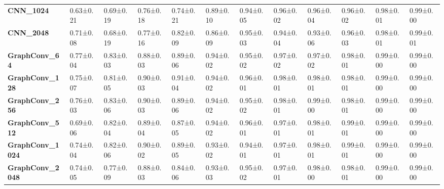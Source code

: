 \begin{tabular}{llllllllllll}
\textbf{CNN\_1024      } &   0.63±0.21 &  0.69±0.19 &  0.76±0.18 &  0.74±0.21 &  0.89±0.10 &  0.94±0.05 &  0.96±0.02 &  0.96±0.04 &  0.96±0.02 &   0.98±0.01 &   0.99±0.00 \\
\textbf{CNN\_2048      } &   0.71±0.08 &  0.68±0.19 &  0.77±0.16 &  0.82±0.09 &  0.86±0.09 &  0.95±0.03 &  0.94±0.04 &  0.93±0.06 &  0.96±0.03 &   0.98±0.01 &   0.99±0.01 \\
\textbf{GraphConv\_64  } &   0.77±0.04 &  0.83±0.03 &  0.88±0.03 &  0.89±0.06 &  0.94±0.02 &  0.95±0.02 &  0.97±0.02 &  0.97±0.02 &  0.98±0.01 &   0.99±0.00 &   0.99±0.00 \\
\textbf{GraphConv\_128 } &   0.75±0.07 &  0.81±0.05 &  0.90±0.03 &  0.91±0.04 &  0.94±0.02 &  0.96±0.01 &  0.98±0.01 &  0.98±0.01 &  0.98±0.01 &   0.99±0.00 &   0.99±0.00 \\
\textbf{GraphConv\_256 } &   0.76±0.03 &  0.83±0.06 &  0.90±0.03 &  0.89±0.06 &  0.94±0.02 &  0.95±0.02 &  0.98±0.01 &  0.99±0.00 &  0.98±0.01 &   0.99±0.00 &   0.99±0.00 \\
\textbf{GraphConv\_512 } &   0.69±0.06 &  0.82±0.04 &  0.89±0.04 &  0.87±0.05 &  0.94±0.02 &  0.96±0.01 &  0.97±0.01 &  0.98±0.01 &  0.99±0.01 &   0.99±0.00 &   0.99±0.00 \\
\textbf{GraphConv\_1024} &   0.74±0.04 &  0.82±0.06 &  0.90±0.02 &  0.89±0.05 &  0.93±0.02 &  0.94±0.01 &  0.97±0.01 &  0.98±0.01 &  0.99±0.01 &   0.99±0.00 &   0.99±0.00 \\
\textbf{GraphConv\_2048} &   0.74±0.05 &  0.77±0.09 &  0.88±0.03 &  0.84±0.06 &  0.93±0.03 &  0.95±0.02 &  0.97±0.01 &  0.98±0.00 &  0.98±0.01 &   0.99±0.00 &   0.99±0.00 \\
\bottomrule
\end{tabular}
